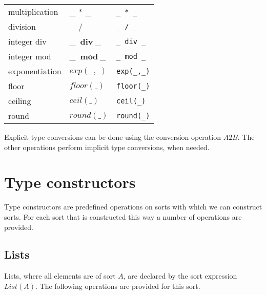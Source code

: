 \documentclass[a4paper,fleqn]{article}
\newcommand{\frm}[1]{\mbox{\ensuremath{#1}}}
\newcommand{\f}[1]{\ensuremath{\mathit{#1}}}
\newcommand{\fa}[2]{\ensuremath{\f{#1}(#2)}}
\newcommand{\faa}[3]{\ensuremath{\f{#1}(#2, #3)}}
\renewcommand{\div}{\ensuremath{\ \mathbf{div}\ }}
\renewcommand{\mod}{\ensuremath{\ \mathbf{mod}\ }}
\begin{document}
\begin{tabular}{|l@{\qquad}L@{\qquad}l|}
multiplication             & \_ * \_                    & \verb+_ * _+\\
division                   & \_ / \_                    & \verb+_ / _+\\
integer div                & \_ \div \_                 & \verb+_ div _+\\
integer mod                & \_ \mod \_                 & \verb+_ mod _+\\
exponentiation             & \faa{exp}{\_\,}{\_}        & \verb+exp(_,_)+\\
floor                      & \fa{floor}{\_}             & \verb+floor(_)+\\
ceiling                    & \fa{ceil}{\_}              & \verb+ceil(_)+\\
round                      & \fa{round}{\_}             & \verb+round(_)+\\
\hline
\end{tabular}\bigskip

\noindent
Explicit type conversions can be done using the conversion operation
\frm{\f{A2B}}. The other operations perform implicit type conversions, when
needed.

\newpage
\section{Type constructors}
\label{sec:TypeConstructors}

Type constructors are predefined operations on sorts with which we can
construct sorts. For each sort that is constructed this way a number of
operations are provided.

\subsection{Lists}

Lists, where all elements are of sort \frm{A}, are declared by the sort
expression \frm{\fa{List}{A}}. The following operations are provided for this
sort.
\end{document}
